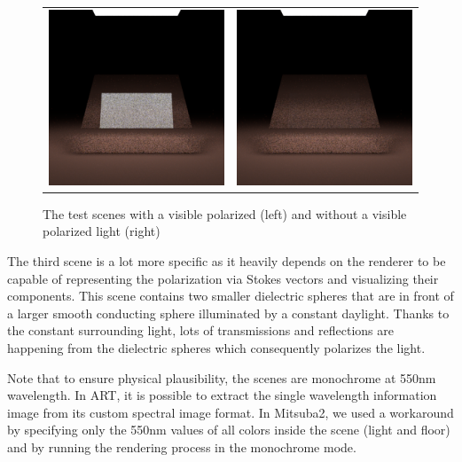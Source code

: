 \begin{figure}[h]
	\begin{tabular}{cc}
		\includegraphics[width=.45\linewidth]{img/polarizing_plane_90.png}
		&
		\includegraphics[width=.45\linewidth]{img/polarizing_plane_0.png}
	\end{tabular}
	\caption{The test scenes with a visible polarized (left) and without a visible polarized light (right)}
	\label{fig:polar_planes}
\end{figure}

The third scene is a lot more specific as it heavily depends on the renderer to be capable of representing the polarization via Stokes vectors and visualizing their components. This scene contains two smaller dielectric spheres that are in front of a larger smooth conducting sphere illuminated by a constant daylight. Thanks to the constant surrounding light, lots of transmissions and reflections are happening from the dielectric spheres which consequently polarizes the light.

Note that to ensure physical plausibility, the scenes are monochrome at 550nm wavelength. In ART, it is possible to extract the single wavelength information image from its custom spectral image format. In Mitsuba2, we used a workaround by specifying only the 550nm values of all colors inside the scene (light and floor) and by running the rendering process in the monochrome mode.

